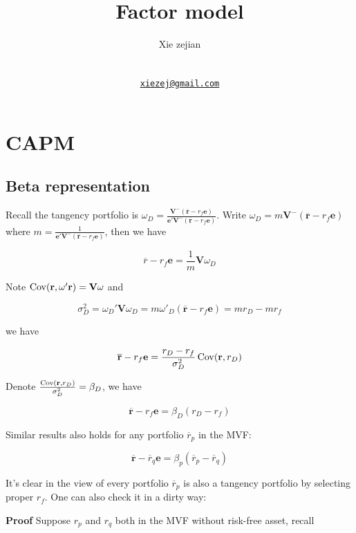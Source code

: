 \documentclass{article}
\title{Factor model}
\author{
    Xie zejian
   \\
     \\
   \\
  \texttt{\href{mailto:xiezej@gmail.com}{\nolinkurl{xiezej@gmail.com}}} \\
  }
\begin{document}
\maketitle

\def\tightlist{}


\begin{abstract}

\end{abstract}


\hypertarget{capm}{%
\section{CAPM}\label{capm}}

\hypertarget{beta-representation}{%
\subsection{Beta representation}\label{beta-representation}}

Recall the tangency portfolio is
\(\omega_D=\frac{\mathbf{V^-}(\overline{\mathbf{r}}-r_f\mathbf{e})}{\mathbf{e'V^-}(\overline{\mathbf{r}}-r_f\mathbf{e})}\).
Write \(\omega_D=m \mathbf{V^-} (\overline{\mathbf{r}}-r_f\mathbf{e})\)
where
\(m=\frac{1}{\mathbf{e'}\mathbf{V^-} (\overline{\mathbf{r}}-r_f\mathbf{e})}\),
then we have

\[ \overline{r}-r_f\mathbf{e}=\frac{1}{m}\mathbf{V}\omega_D \]

Note \(\operatorname{Cov}(\mathbf{r},\omega'\mathbf{r})=\mathbf{V\omega}\) and

\[ \sigma_D^2=\omega_D'\mathbf{V}\omega_D=m\omega'_D(\overline{\mathbf{r}}-r_f\mathbf{e})= mr_D-mr_f \]

we have

\[ \overline{\mathbf{r}}-r_f\mathbf{e}=\frac{r_D-r_f}{\sigma_D^2}\operatorname{Cov}(\mathbf{r},{r_D}) \]

Denote \(\frac{\operatorname{Cov}(\mathbf{r},{r_D})}{\sigma_D^2}=\beta_D\), we have

\[ \overline{\mathbf{r}}-r_f\mathbf{e}=\beta_D({r_D-r_f}) \]

Similar results also holds for any portfolio \(\overline{r}_p\) in the
MVF:

\[ \overline{\mathbf{r}}-\overline{r}_q\mathbf{e}=\beta_p(\overline{r}_p-\overline{r}_q) \]

It's clear in the view of every portfolio \(\overline{r}_p\) is also a
tangency portfolio by selecting proper \(r_f\). One can also check it in
a dirty way:

\textbf{Proof} Suppose \(r_p\) and \(r_q\) both in the MVF without
risk-free asset, recall
\end{document}
